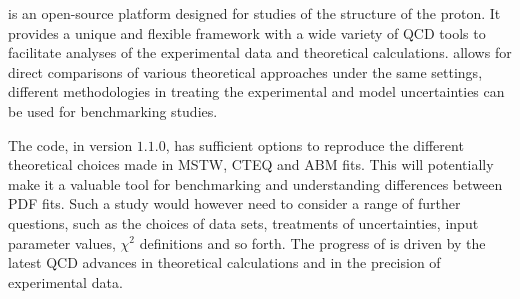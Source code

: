 
\label{sec:summary}
\fitter is an open-source platform designed for studies of the structure of the proton.
It provides a unique and flexible framework with a wide variety of QCD tools to 
facilitate analyses of the experimental data and theoretical calculations. 
\fitter allows for direct comparisons of various theoretical approaches under the same settings,
different methodologies in treating the experimental and model uncertainties can be used for benchmarking studies.

The \fitter code, in version $1.1.0$, has sufficient options to reproduce the different theoretical choices made in MSTW, CTEQ and ABM fits. This will potentially make it a  
valuable tool for benchmarking and understanding differences between PDF fits. Such a study would however need to consider a range of further questions, such as the choices of
data sets, treatments of uncertainties, input parameter values, $\chi^2$ definitions and so forth. The progress of \fitter is driven by the latest QCD advances in theoretical calculations and in the precision of experimental data.




